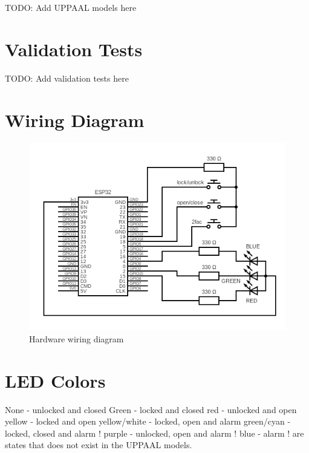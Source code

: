TODO: Add UPPAAL models here

\section{Validation Tests}
\label{app:ValidationTests}

TODO: Add validation tests here

\section{Wiring Diagram}
\label{app:WiringDiagram}

\begin{figure}[tbh]
\includegraphics[width=.95\textwidth]{./../circuit/circuit.png}
\caption{Hardware wiring diagram}
\label{app:fig:WiringDiagram}
\end{figure}

\section{LED Colors}
\label{app:LEDColors}
None - unlocked and closed
\newline
Green - locked and closed
\newline
red - unlocked and open
\newline
yellow - locked and open
\newline
yellow/white - locked, open and alarm
\newline
green/cyan - locked, closed and alarm
\newline
! purple - unlocked, open and alarm
\newline
! blue - alarm
\newline
! are states that does not exist in the UPPAAL models.
